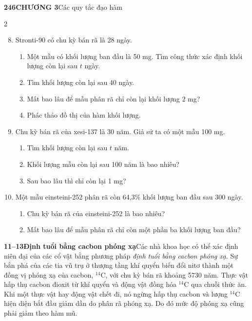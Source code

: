 {\small\textsf{\textbf{246}}\qquad\textsf{\textbf{CHƯƠNG 3}}\quad\textsf{Các quy tắc đạo hàm}}
\vspace{10pt}

\setlength{\columnsep}{22pt}
\begin{paracol}{2}

\begin{enumerate}[label=\textbf{\arabic*.},leftmargin=*,itemsep=9pt,topsep=0pt,parsep=2pt]
  \setcounter{enumi}{7}
  \item Stronti-90 có chu kỳ bán rã là 28 ngày.
    \begin{enumerate}[label=\textbf{(\alph*)},leftmargin=1.5em,itemsep=1.5pt,topsep=1.5pt]
      \item Một mẫu có khối lượng ban đầu là 50 mg. Tìm công thức xác định khối lượng còn lại sau $t$ ngày.
      \item Tìm khối lượng còn lại sau 40 ngày.
      \item Mất bao lâu để mẫu phân rã chỉ còn lại khối lượng 2 mg?
      \item Phác thảo đồ thị của hàm khối lượng.
    \end{enumerate}

  \item Chu kỳ bán rã của xesi-137 là 30 năm. Giả sử ta có một mẫu 100 mg.
    \begin{enumerate}[label=\textbf{(\alph*)},leftmargin=1.5em,itemsep=1.5pt,topsep=1.5pt]
      \item Tìm khối lượng còn lại sau $t$ năm.
      \item Khối lượng mẫu còn lại sau 100 năm là bao nhiêu?
      \item Sau bao lâu thì chỉ còn lại 1 mg?
    \end{enumerate}

  \item Một mẫu einsteini-252 phân rã còn 64,3\% khối lượng ban đầu sau 300 ngày.
    \begin{enumerate}[label=\textbf{(\alph*)},leftmargin=1.5em,itemsep=1.5pt,topsep=1.5pt]
      \item Chu kỳ bán rã của einsteini-252 là bao nhiêu?
      \item Mất bao lâu để mẫu phân rã chỉ còn một phần ba khối lượng ban đầu?
    \end{enumerate}
\end{enumerate}

\vspace{6pt}
{\small
\noindent\textbf{\textcolor{exercisecyan}{11–13}}\enspace\textbf{Định tuổi bằng cacbon phóng xạ}\enspace Các nhà khoa học có thể xác định niên đại của các cổ vật bằng phương pháp \textit{định tuổi bằng cacbon phóng xạ}. Sự bắn phá của các tia vũ trụ ở thượng tầng khí quyển biến đổi nitơ thành một đồng vị phóng xạ của cacbon, $^{14}\text{C}$, với chu kỳ bán rã khoảng 5730 năm. Thực vật hấp thụ cacbon đioxit từ khí quyển và động vật đồng hóa $^{14}\text{C}$ qua chuỗi thức ăn. Khi một thực vật hay động vật chết đi, nó ngừng hấp thụ cacbon và lượng $^{14}\text{C}$ hiện diện bắt đầu giảm dần do phân rã phóng xạ. Do đó mức độ phóng xạ cũng phải giảm theo hàm mũ.\par
}


\end{paracol}
